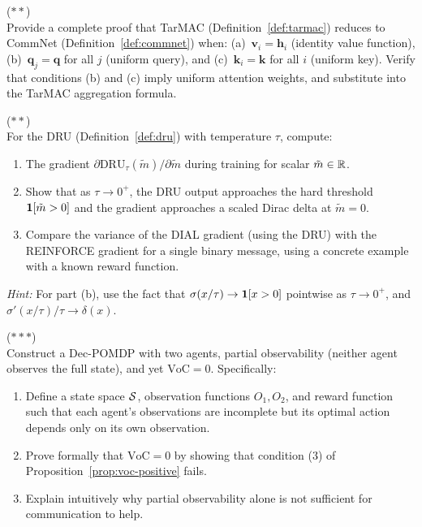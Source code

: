 \documentclass[11pt,a4paper]{article}
\begin{document}
\begin{exercise}
\textnormal{(\(**\))} \\
Provide a complete proof that TarMAC (Definition~\ref{def:tarmac})
reduces to CommNet (Definition~\ref{def:commnet}) when:
(a)~$\mathbf{v}_i = \mathbf{h}_i$ (identity value function),
(b)~$\mathbf{q}_j = \mathbf{q}$ for all $j$ (uniform query),
and (c)~$\mathbf{k}_i = \mathbf{k}$ for all $i$ (uniform key).
Verify that conditions (b) and (c) imply uniform attention
weights, and substitute into the TarMAC aggregation formula.
\end{exercise}

\begin{exercise}
\textnormal{(\(**\))} \\
For the DRU (Definition~\ref{def:dru}) with temperature $\tau$,
compute:
\begin{enumerate}[nosep,label=(\alph*)]
  \item The gradient $\partial \mathrm{DRU}_\tau(\tilde{m}) /
    \partial \tilde{m}$ during training for scalar $\tilde{m}
    \in \mathbb{R}$.
  \item Show that as $\tau \to 0^+$, the DRU output approaches
    the hard threshold $\mathbf{1}[\tilde{m} > 0]$ and the
    gradient approaches a scaled Dirac delta at
    $\tilde{m} = 0$.
  \item Compare the variance of the DIAL gradient (using the
    DRU) with the REINFORCE gradient for a single binary
    message, using a concrete example with a known reward
    function.
\end{enumerate}
\textit{Hint:} For part (b), use the fact that
$\sigma(x/\tau) \to \mathbf{1}[x > 0]$ pointwise as
$\tau \to 0^+$, and $\sigma'(x/\tau)/\tau \to \delta(x)$.
\end{exercise}

\begin{exercise}[Constructing a Dec-POMDP with VoC = 0]
\textnormal{(\(***\))} \\
Construct a Dec-POMDP with two agents, partial observability
(neither agent observes the full state), and yet
$\mathrm{VoC} = 0$.  Specifically:
\begin{enumerate}[nosep,label=(\alph*)]
  \item Define a state space $\mathcal{S}$, observation functions
    $O_1, O_2$, and reward function such that each agent's
    observations are incomplete but its optimal action depends
    only on its own observation.
  \item Prove formally that $\mathrm{VoC} = 0$ by showing that
    condition (3) of Proposition~\ref{prop:voc-positive} fails.
  \item Explain intuitively why partial observability alone is
    not sufficient for communication to help.
\end{enumerate}
\end{exercise}
\end{document}
